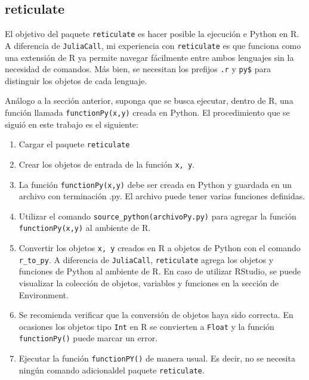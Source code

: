 \subsection{reticulate}

El objetivo del paquete \texttt{reticulate} es hacer posible la ejecución e \textsf{Python} en \textsf{R}. A diferencia de \texttt{JuliaCall}, mi experiencia con \texttt{reticulate} es que funciona como una extensión de \textsf{R} ya permite navegar fácilmente entre ambos lenguajes sin la necesidad de comandos. Más bien, se necesitan los prefijos \texttt{.r} y \texttt{py\$} para distinguir los objetos de cada lenguaje. 

Análogo a la sección anterior, suponga que se busca ejecutar, dentro de \textsf{R}, una función llamada \texttt{functionPy(x,y)} creada en \textsf{Python}. El procedimiento que se siguió en este trabajo es el siguiente: 

\begin{enumerate}
	\item Cargar el paquete \texttt{reticulate}
	
	\item Crear los objetos de entrada de la función \texttt{x, y}.
	
	\item La función \texttt{functionPy(x,y)} debe ser creada en \textsf{Python} y guardada en un archivo con terminación \textsf{.py}. El archivo puede tener varias funciones definidas. 
	
	\item Utilizar el comando \texttt{source\_python(archivoPy.py)} para agregar la función \texttt{functionPy(x,y)} al ambiente de \textsf{R}.
	
	\item Convertir los objetos \texttt{x, y} creados en \textsf{R} a objetos de \textsf{Python} con el comando \texttt{r\_to\_py}. A diferencia de \texttt{JuliaCall}, \texttt{reticulate} agrega los objetos y funciones de \textsf{Python} al ambiente de \textsf{R}. En caso de utilizar \textsf{RStudio}, se puede visualizar la colección de objetos, variables y funciones en la sección de \textsf{Environment}. 
	
	\item Se recomienda verificar que la conversión de objetos haya sido correcta. En ocasiones los objetos tipo \texttt{Int} en \textsf{R} se convierten a \texttt{Float} y la función \texttt{functionPy()} puede marcar un error. 
	
	\item Ejecutar la función \texttt{functionPY()} de manera usual. Es decir, no se necesita ningún comando adicionaldel paquete \texttt{reticulate}. 
	
	
\end{enumerate}


